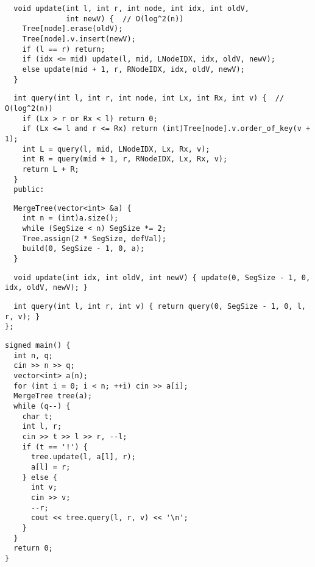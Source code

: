 \documentclass[twoside]{article}
\begin{document}
\begin{multicols*}{2}
\begin{verbatim}
  void update(int l, int r, int node, int idx, int oldV,
              int newV) {  // O(log^2(n))
    Tree[node].erase(oldV);
    Tree[node].v.insert(newV);
    if (l == r) return;
    if (idx <= mid) update(l, mid, LNodeIDX, idx, oldV, newV);
    else update(mid + 1, r, RNodeIDX, idx, oldV, newV);
  }
\end{verbatim}
\vspace{-12pt}
\begin{verbatim}
  int query(int l, int r, int node, int Lx, int Rx, int v) {  // O(log^2(n))
    if (Lx > r or Rx < l) return 0;
    if (Lx <= l and r <= Rx) return (int)Tree[node].v.order_of_key(v + 1);
    int L = query(l, mid, LNodeIDX, Lx, Rx, v);
    int R = query(mid + 1, r, RNodeIDX, Lx, Rx, v);
    return L + R;
  }
  public:
\end{verbatim}
\vspace{-12pt}
\begin{verbatim}
  MergeTree(vector<int> &a) {
    int n = (int)a.size();
    while (SegSize < n) SegSize *= 2;
    Tree.assign(2 * SegSize, defVal);
    build(0, SegSize - 1, 0, a);
  }
\end{verbatim}
\vspace{-12pt}
\begin{verbatim}
  void update(int idx, int oldV, int newV) { update(0, SegSize - 1, 0, idx, oldV, newV); }
\end{verbatim}
\vspace{-12pt}
\begin{verbatim}
  int query(int l, int r, int v) { return query(0, SegSize - 1, 0, l, r, v); }
};
\end{verbatim}
\vspace{-12pt}
\begin{verbatim}
signed main() {
  int n, q;
  cin >> n >> q;
  vector<int> a(n);
  for (int i = 0; i < n; ++i) cin >> a[i];
  MergeTree tree(a);
  while (q--) {
    char t;
    int l, r;
    cin >> t >> l >> r, --l;
    if (t == '!') {
      tree.update(l, a[l], r);
      a[l] = r;
    } else {
      int v;
      cin >> v;
      --r;
      cout << tree.query(l, r, v) << '\n';
    }
  }
  return 0;
}

\end{verbatim}

{
}
\end{multicols*}
\end{document}
